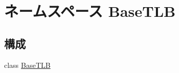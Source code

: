 \hypertarget{namespaceBaseTLB}{
\section{ネームスペース BaseTLB}
\label{namespaceBaseTLB}
}
\subsection*{構成}
\begin{DoxyCompactItemize}
\item 
class \hyperlink{classBaseTLB_1_1BaseTLB}{BaseTLB}
\end{DoxyCompactItemize}
